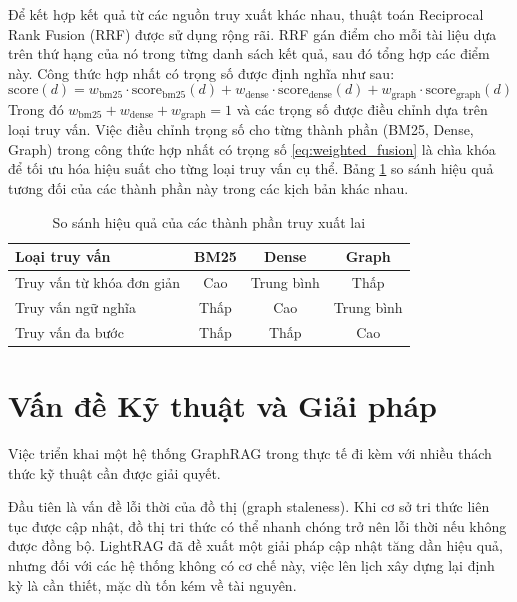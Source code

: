 Để kết hợp kết quả từ các nguồn truy xuất khác nhau, thuật toán Reciprocal Rank Fusion (RRF) được sử dụng rộng rãi. RRF gán điểm cho mỗi tài liệu dựa trên thứ hạng của nó trong từng danh sách kết quả, sau đó tổng hợp các điểm này. Công thức hợp nhất có trọng số được định nghĩa như sau:
\begin{equation}
\text{score}(d) = w_{\text{bm25}} \cdot \text{score}_{\text{bm25}}(d) + w_{\text{dense}} \cdot \text{score}_{\text{dense}}(d) + w_{\text{graph}} \cdot \text{score}_{\text{graph}}(d)
\label{eq:weighted_fusion}
\end{equation}
Trong đó $w_{\text{bm25}} + w_{\text{dense}} + w_{\text{graph}} = 1$ và các trọng số được điều chỉnh dựa trên loại truy vấn. Việc điều chỉnh trọng số cho từng thành phần (BM25, Dense, Graph) trong công thức hợp nhất có trọng số \eqref{eq:weighted_fusion} là chìa khóa để tối ưu hóa hiệu suất cho từng loại truy vấn cụ thể. Bảng \ref{tab:retrieval_strategies} so sánh hiệu quả tương đối của các thành phần này trong các kịch bản khác nhau.

\begin{table}[htbp]
\centering
\caption{So sánh hiệu quả của các thành phần truy xuất lai}
\label{tab:retrieval_strategies}
\begin{tabular}{|l|c|c|c|}
\hline
\textbf{Loại truy vấn} & \textbf{BM25} & \textbf{Dense} & \textbf{Graph} \\
\hline
Truy vấn từ khóa đơn giản & Cao & Trung bình & Thấp \\
\hline
Truy vấn ngữ nghĩa & Thấp & Cao & Trung bình \\
\hline
Truy vấn đa bước & Thấp & Thấp & Cao \\
\hline
\end{tabular}
\end{table}

\section{Vấn đề Kỹ thuật và Giải pháp}
\label{sec:technical_challenges}

Việc triển khai một hệ thống GraphRAG trong thực tế đi kèm với nhiều thách thức kỹ thuật cần được giải quyết.

Đầu tiên là vấn đề lỗi thời của đồ thị (graph staleness). Khi cơ sở tri thức liên tục được cập nhật, đồ thị tri thức có thể nhanh chóng trở nên lỗi thời nếu không được đồng bộ. LightRAG đã đề xuất một giải pháp cập nhật tăng dần hiệu quả, nhưng đối với các hệ thống không có cơ chế này, việc lên lịch xây dựng lại định kỳ là cần thiết, mặc dù tốn kém về tài nguyên.

